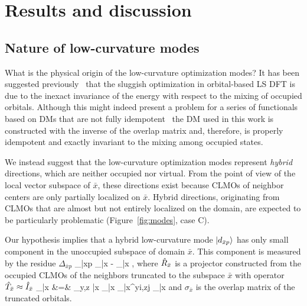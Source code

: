 \documentclass[aps,prl,twocolumn,reprint,amsmath,amssymb]{revtex4-1}
\begin{document}
\section{Results and discussion}

\subsection{Nature of low-curvature modes} \label{marker:nature} 

What is the physical origin of the low-curvature optimization modes? 
It has been suggested previously~\cite{goedecker1999linear} that the sluggish optimization in orbital-based LS DFT is due to the inexact invariance of the energy with respect to the mixing of occupied orbitals. 
Although this might indeed present a problem for a series of functionals based on DMs that are not fully idempotent~\cite{mauri1993orbital,kim1995total,ordejon1995linear} the DM used in this work is constructed with the inverse of the overlap matrix and, therefore, is properly idempotent and exactly invariant to the mixing among occupied states. 

We instead suggest that the low-curvature optimization modes represent \emph{hybrid} directions, which are neither occupied nor virtual. From the point of view of the local vector subspace of $\bar{x}$, these directions exist because CLMOs of neighbor centers are only partially localized on $\bar{x}$. 
Hybrid directions, originating from CLMOs that are almost but not entirely localized on the domain, are expected to be particularly problematic (Figure~\ref{fig:modes}, case C). 


%
Our hypothesis implies that a hybrid low-curvature mode $\vert d_{\bar{x}p} \rangle$ has only small component in the unoccupied subspace of domain $\bar{x}$. 
This component is measured by the residue $\Delta_{\bar{x}p}$ 
\bea
\label{eq:residue}
\Delta_{\bar{x}p} \equiv {} _{\bar{x}} - _{\bar{x}} , 
\eea
%
where $\hat{R}_{\bar{x}}$ is a projector constructed from the occupied CLMOs of the neighbors truncated to the subspace $\bar{x}$ with operator $\hat{T}_{\bar{x}} \approx \hat{I}_{\bar{x}}$
\bea
{}_{\bar{x}} &=& \sum_{y,z \in \bar{x}} _{\bar{x}}  \sigma_{\bar{x}}^{yi,zj}  _{\bar{x}}
\label{eq:C}
\eea
%
and $\sigma_{\bar{x}}$ is the overlap matrix of the truncated orbitals. 
\end{document}

